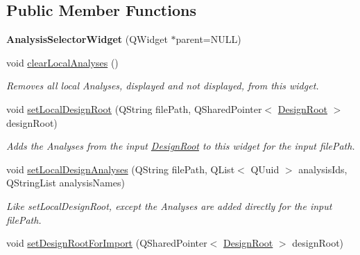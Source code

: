 \subsection*{Public Member Functions}
\begin{DoxyCompactItemize}
\item 
\hypertarget{class_picto_1_1_analysis_selector_widget_ac9069aa94619238a30eba9c913efc540}{{\bfseries Analysis\-Selector\-Widget} (Q\-Widget $\ast$parent=N\-U\-L\-L)}\label{class_picto_1_1_analysis_selector_widget_ac9069aa94619238a30eba9c913efc540}

\item 
\hypertarget{class_picto_1_1_analysis_selector_widget_aab487ca4ca8b7297d1d69f18b9a72ca5}{void \hyperlink{class_picto_1_1_analysis_selector_widget_aab487ca4ca8b7297d1d69f18b9a72ca5}{clear\-Local\-Analyses} ()}\label{class_picto_1_1_analysis_selector_widget_aab487ca4ca8b7297d1d69f18b9a72ca5}

\begin{DoxyCompactList}\small\item\em Removes all local Analyses, displayed and not displayed, from this widget. \end{DoxyCompactList}\item 
void \hyperlink{class_picto_1_1_analysis_selector_widget_ad0ecc27ca19d88c0b90d6dcc2c17f270}{set\-Local\-Design\-Root} (Q\-String file\-Path, Q\-Shared\-Pointer$<$ \hyperlink{class_picto_1_1_design_root}{Design\-Root} $>$ design\-Root)
\begin{DoxyCompactList}\small\item\em Adds the Analyses from the input \hyperlink{class_picto_1_1_design_root}{Design\-Root} to this widget for the input file\-Path. \end{DoxyCompactList}\item 
void \hyperlink{class_picto_1_1_analysis_selector_widget_a9d5fc6429780f442dcf4dbe39cc61b75}{set\-Local\-Design\-Analyses} (Q\-String file\-Path, Q\-List$<$ Q\-Uuid $>$ analysis\-Ids, Q\-String\-List analysis\-Names)
\begin{DoxyCompactList}\small\item\em Like set\-Local\-Design\-Root, except the Analyses are added directly for the input file\-Path. \end{DoxyCompactList}\item 
\hypertarget{class_picto_1_1_analysis_selector_widget_a0467f2bfe3c50f37d30e427dd9c66736}{void \hyperlink{class_picto_1_1_analysis_selector_widget_a0467f2bfe3c50f37d30e427dd9c66736}{set\-Design\-Root\-For\-Import} (Q\-Shared\-Pointer$<$ \hyperlink{class_picto_1_1_design_root}{Design\-Root} $>$ design\-Root)}\label{class_picto_1_1_analysis_selector_widget_a0467f2bfe3c50f37d30e427dd9c66736}


\end{DoxyCompactItemize}
